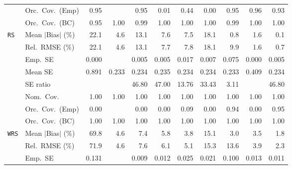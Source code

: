 \begin{landscape}
\begin{longtable}{llrrrrrrrrr}
 & Orc.\ Cov.\ (Emp) & \cellcolor{rankone}0.95 &  & \cellcolor{rankone}0.95 & 0.01 & 0.44 & 0.00 & \cellcolor{rankone}0.95 & \cellcolor{ranktwo}0.96 & \cellcolor{rankthree}0.93 \\
 & Orc.\ Cov.\ (BC) & \cellcolor{rankone}0.95 & \cellcolor{rankthree}1.00 & \cellcolor{ranktwo}0.99 & \cellcolor{rankthree}1.00 & \cellcolor{rankthree}1.00 & \cellcolor{rankthree}1.00 & \cellcolor{ranktwo}0.99 & \cellcolor{rankthree}1.00 & \cellcolor{rankthree}1.00 \\
\addlinespace[2pt]
\quad \texttt{RS} & Mean $|$Bias$|$ (\%) & 22.1 & 4.6 & 13.1 & 7.6 & 7.5 & 18.1 & \cellcolor{ranktwo}0.8 & \cellcolor{rankthree}1.6 & \cellcolor{rankone}0.1 \\
 & Rel.\ RMSE (\%) & 22.1 & \cellcolor{rankthree}4.6 & 13.1 & 7.7 & 7.8 & 18.1 & 9.9 & \cellcolor{ranktwo}1.6 & \cellcolor{rankone}0.7 \\
 & Emp.\ SE & 0.000 &  & 0.005 & 0.005 & 0.017 & 0.007 & 0.075 & 0.000 & 0.005 \\
 & Mean SE & 0.891 & 0.233 & 0.234 & 0.235 & 0.234 & 0.234 & 0.233 & 0.409 & 0.234 \\
 & SE ratio &  &  & 46.80 & 47.00 & \cellcolor{ranktwo}13.76 & \cellcolor{rankthree}33.43 & \cellcolor{rankone}3.11 &  & 46.80 \\
 & Nom.\ Cov. & \cellcolor{rankone}1.00 & \cellcolor{rankone}1.00 & \cellcolor{rankone}1.00 & \cellcolor{rankone}1.00 & \cellcolor{rankone}1.00 & \cellcolor{rankone}1.00 & \cellcolor{rankone}1.00 & \cellcolor{rankone}1.00 & \cellcolor{rankone}1.00 \\
 & Orc.\ Cov.\ (Emp) & 0.00 &  & 0.00 & 0.00 & \cellcolor{rankthree}0.09 & 0.00 & \cellcolor{ranktwo}0.94 & 0.00 & \cellcolor{rankone}0.95 \\
 & Orc.\ Cov.\ (BC) & \cellcolor{rankone}1.00 & \cellcolor{rankone}1.00 & \cellcolor{rankone}1.00 & \cellcolor{rankone}1.00 & \cellcolor{rankone}1.00 & \cellcolor{rankone}1.00 & \cellcolor{rankone}1.00 & \cellcolor{rankone}1.00 & \cellcolor{rankone}1.00 \\
\addlinespace[2pt]
\quad \texttt{WRS} & Mean $|$Bias$|$ (\%) & 69.8 & 4.6 & 7.4 & 5.8 & 3.8 & 15.1 & \cellcolor{ranktwo}3.0 & \cellcolor{rankthree}3.5 & \cellcolor{rankone}1.8 \\
 & Rel.\ RMSE (\%) & 71.9 & \cellcolor{rankthree}4.6 & 7.6 & 6.1 & 5.1 & 15.3 & 13.6 & \cellcolor{ranktwo}3.9 & \cellcolor{rankone}2.3 \\
 & Emp.\ SE & 0.131 &  & 0.009 & 0.012 & 0.025 & 0.021 & 0.100 & 0.013 & 0.011 \\

\end{longtable}
\end{landscape}
